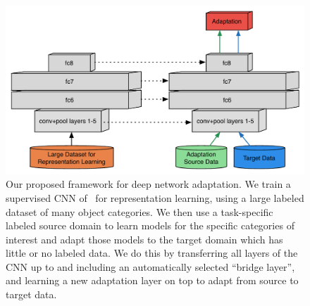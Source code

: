 \newcommand{\svmT}{\bm{\theta}}
\newcommand{\svmB}{b}
\newcommand{\svmAug}{\tilde{\svmT}}
\newcommand{\svmAugAll}{\bm{\Theta}}


\begin{figure}
\begin{center}
\includegraphics[width=.6\linewidth]{figs/model-adapt}
\end{center}
\caption{Our proposed framework for deep network adaptation. We train a supervised CNN of~\cite{supervision} for representation learning, using a large labeled dataset of many object categories. We then use a task-specific labeled source domain to learn models for the specific categories of interest and adapt those models to the target domain which has little or no labeled data.  We do this by transferring all layers of the CNN up to and including an automatically selected ``bridge layer'', and learning a new adaptation layer on top to adapt from source to target data.}
\label{fig:model-adapt}
\end{figure}

